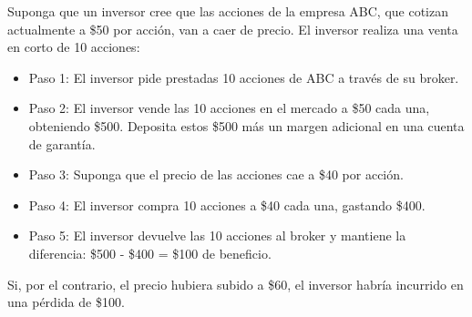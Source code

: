 \begin{ejemplo}
Suponga que un inversor cree que las acciones de la empresa ABC, que cotizan actualmente a \$50 por acción, van a caer de precio. El inversor realiza una venta en corto de 10 acciones:

\begin{itemize}
\item Paso 1: El inversor pide prestadas 10 acciones de ABC a través de su broker.
\item Paso 2: El inversor vende las 10 acciones en el mercado a \$50 cada una, obteniendo \$500. Deposita estos \$500 más un margen adicional en una cuenta de garantía.
\item Paso 3: Suponga que el precio de las acciones cae a \$40 por acción.
\item Paso 4: El inversor compra 10 acciones a \$40 cada una, gastando \$400.
\item Paso 5: El inversor devuelve las 10 acciones al broker y mantiene la diferencia: \$500 - \$400 = \$100 de beneficio.
\end{itemize}

Si, por el contrario, el precio hubiera subido a \$60, el inversor habría incurrido en una pérdida de \$100.
\end{ejemplo}

